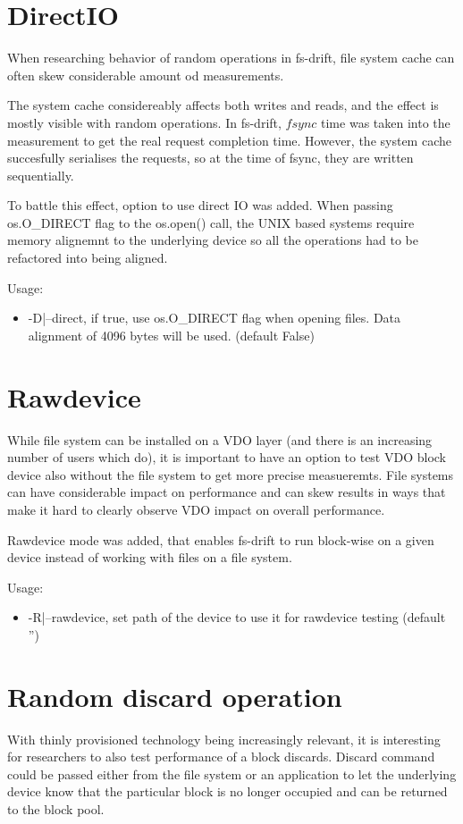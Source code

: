 \documentclass[
  color, %
  table, %
  lof,   %
  lot,   %
]{fithesis3}
\begin{document}
\section{DirectIO}
When researching behavior of random operations in fs-drift, file system cache can often skew considerable amount od measurements.


The system cache considereably affects both writes and reads, and the effect is mostly visible with random operations. In fs-drift, $fsync$ time was taken into the measurement to get the real request completion time. However, the system cache succesfully serialises the requests, so at the time of fsync, they are written sequentially.

To battle this effect, option to use direct IO was added. When passing os.O\_DIRECT flag to the os.open() call, the UNIX based systems require memory alignemnt to the underlying device so all the operations had to be refactored into being aligned.

Usage:
\begin{itemize}
    \item -D|--direct, if true, use os.O\_DIRECT flag when opening files. Data alignment of 4096 bytes will be used. (default False)
\end{itemize}

\section{Rawdevice}
While file system can be installed on a VDO layer (and there is an increasing number of users which do), it is important to have an option to test VDO block device also without the file system to get more precise measueremts. File systems can have considerable impact on performance and can skew results in ways that make it hard to clearly observe VDO impact on overall performance.

Rawdevice mode was added, that enables fs-drift to run block-wise on a given device instead of working with files on a file system.

Usage:
\begin{itemize}
    \item -R|--rawdevice, set path of the device to use it for rawdevice testing (default '')
\end{itemize}


\section{Random discard operation}
With thinly provisioned technology being increasingly relevant, it is interesting for researchers to also test performance of a block discards. Discard command could be passed either from the file system or an application to let the underlying device know that the particular block is no longer occupied and can be returned to the block pool.
\end{document}

